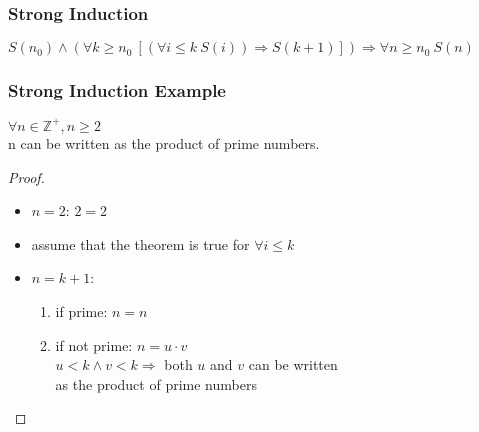 \documentclass[dvipsnames]{beamer}
\begin{document}
\begin{frame}
  \frametitle{Strong Induction}

  \begin{definition}
    $S(n_0) \wedge
      (\forall k \geq n_0~[(\forall i \leq k~S(i)) \Rightarrow S(k+1)])
      \Rightarrow \forall n \geq n_0~S(n)$
  \end{definition}
\end{frame}

\begin{frame}
  \frametitle{Strong Induction Example}

  \begin{theorem}
    $\forall n \in \mathbb{Z}^+, n \geq 2$\\
      n can be written as the product of prime numbers.
  \end{theorem}

  \pause
  \begin{proof}
    \begin{itemize}
      \item $n=2$: $2=2$

      \pause
      \item assume that the theorem is true for $\forall i \leq k$

      \pause
      \item $n=k+1$:
      \begin{enumerate}
        \item if prime: $n=n$

        \pause
        \item if not prime: $n=u \cdot v$\\
          $u < k \wedge v < k \Rightarrow$ both $u$ and $v$ can be written\\
          as the product of prime numbers
      \end{enumerate}
    \end{itemize}
  \end{proof}
\end{frame}
\end{document}
